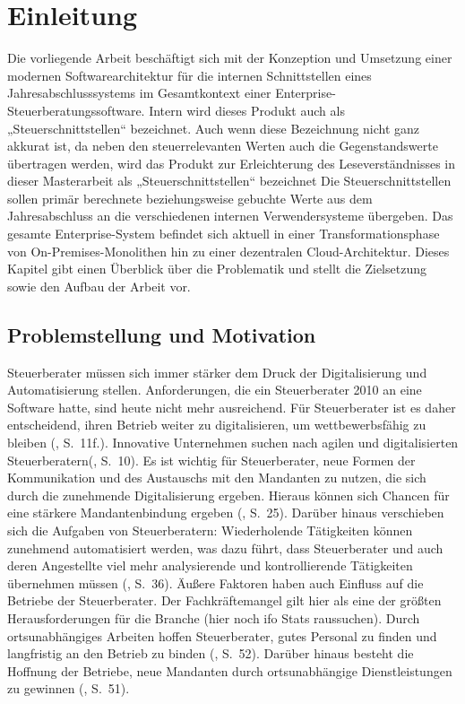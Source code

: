 \chapter{Einleitung}
Die vorliegende Arbeit beschäftigt sich mit der Konzeption und Umsetzung einer modernen Softwarearchitektur 
für die internen Schnittstellen eines Jahresabschlusssystems im Gesamtkontext einer Enterprise-Steuerberatungssoftware. Intern wird dieses Produkt auch als „Steuerschnittstellen“ bezeichnet. Auch wenn diese Bezeichnung nicht ganz akkurat ist, da neben den steuerrelevanten Werten auch die Gegenstandswerte übertragen werden, wird das Produkt zur Erleichterung des Leseverständnisses in dieser Masterarbeit als „Steuerschnittstellen“ bezeichnet
Die Steuerschnittstellen sollen primär berechnete beziehungsweise gebuchte Werte aus dem Jahresabschluss 
an die verschiedenen internen Verwendersysteme übergeben. Das gesamte Enterprise-System befindet sich aktuell in einer Transformationsphase von On-Premises-Monolithen hin zu einer dezentralen Cloud-Architektur.
Dieses Kapitel gibt einen Überblick über die Problematik und stellt die Zielsetzung sowie den Aufbau der Arbeit vor.

\section{Problemstellung und Motivation}
Steuerberater müssen sich immer stärker dem Druck der Digitalisierung und Automatisierung stellen. Anforderungen, die ein Steuerberater
2010 an eine Software hatte, sind heute nicht mehr ausreichend. Für Steuerberater ist es daher entscheidend, ihren Betrieb weiter zu digitalisieren, 
um wettbewerbsfähig zu bleiben (\cite{Siegmann2023}, S.~11f.). Innovative Unternehmen suchen nach agilen und digitalisierten Steuerberatern(\cite{Siegmann2023}, S.~10). 
Es ist wichtig für Steuerberater, neue Formen der Kommunikation und des Austauschs mit den Mandanten zu nutzen, die sich durch die zunehmende Digitalisierung ergeben. Hieraus können sich Chancen für eine stärkere Mandantenbindung ergeben (\cite{Siegmann2023}, S.~25).
Darüber hinaus verschieben sich die Aufgaben von Steuerberatern: Wiederholende Tätigkeiten können zunehmend automatisiert werden, was dazu führt, dass Steuerberater und auch deren Angestellte viel mehr analysierende und kontrollierende Tätigkeiten
übernehmen müssen (\cite{Siegmann2023}, S.~36).  Äußere Faktoren haben auch Einfluss auf die Betriebe der Steuerberater. Der Fachkräftemangel gilt hier als eine der größten Herausforderungen für die Branche (hier noch ifo Stats raussuchen).
Durch ortsunabhängiges Arbeiten hoffen Steuerberater, gutes Personal zu finden und langfristig an den Betrieb zu binden (\cite{Siegmann2023}, S.~52). Darüber hinaus besteht die Hoffnung der Betriebe, neue Mandanten durch ortsunabhängige Dienstleistungen zu gewinnen (\cite{Siegmann2023}, S.~51). 

